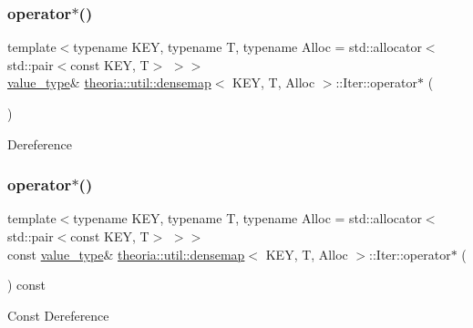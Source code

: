 \subsubsection{\texorpdfstring{operator$\ast$()}{operator*()}\hspace{0.1cm}{\footnotesize\ttfamily [1/2]}}
{\footnotesize\ttfamily template$<$typename K\+EY, typename T, typename Alloc = std\+::allocator$<$std\+::pair$<$const K\+E\+Y, T$>$ $>$$>$ \\
\hyperlink{classtheoria_1_1util_1_1densemap_1_1Iter_a8a1cedbd37c4faee8284d6f1debd49f2}{value\+\_\+type}\& \hyperlink{classtheoria_1_1util_1_1densemap}{theoria\+::util\+::densemap}$<$ K\+EY, T, Alloc $>$\+::Iter\+::operator$\ast$ (\begin{DoxyParamCaption}{ }\end{DoxyParamCaption})\hspace{0.3cm}{\ttfamily [inline]}}

Dereference \mbox{\label{classtheoria_1_1util_1_1densemap_1_1Iter_ae2865858e0d4e2e8b946b3c3eabe2767}} 
\subsubsection{\texorpdfstring{operator$\ast$()}{operator*()}\hspace{0.1cm}{\footnotesize\ttfamily [2/2]}}
{\footnotesize\ttfamily template$<$typename K\+EY, typename T, typename Alloc = std\+::allocator$<$std\+::pair$<$const K\+E\+Y, T$>$ $>$$>$ \\
const \hyperlink{classtheoria_1_1util_1_1densemap_1_1Iter_a8a1cedbd37c4faee8284d6f1debd49f2}{value\+\_\+type}\& \hyperlink{classtheoria_1_1util_1_1densemap}{theoria\+::util\+::densemap}$<$ K\+EY, T, Alloc $>$\+::Iter\+::operator$\ast$ (\begin{DoxyParamCaption}{ }\end{DoxyParamCaption}) const\hspace{0.3cm}{\ttfamily [inline]}}

Const Dereference \mbox{\label{classtheoria_1_1util_1_1densemap_1_1Iter_a484492c01c0db1a25dc4e475d99ba82f}} 
